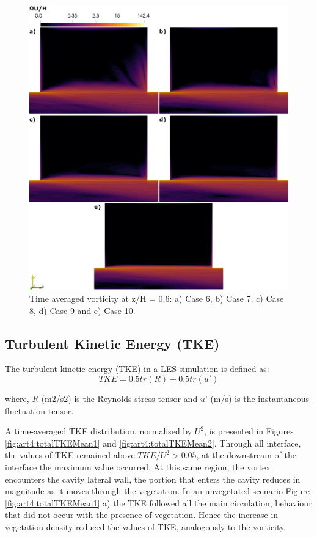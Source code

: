 \begin{figure}[!htb]
\centering
\includegraphics[width=\linewidth]{../images/art4/vorticityMean2.jpeg}
\caption{Time averaged vorticity at z/H = 0.6: a) Case 6, b) Case 7, c) Case 8, d) Case 9 and e) Case 10.}
\label{fig:art4:vorticityMean2}
\end{figure}
\FloatBarrier
\subsection{Turbulent Kinetic Energy (TKE)}
The turbulent kinetic energy (TKE) in a LES simulation is defined as:
\begin{equation}
TKE = 0.5 tr(R) + 0.5 tr(u')
\label{eqn:art4:tke}
\end{equation}

where, $R$ (m2/s2) is the Reynolds stress tensor and $u’$ (m/s) is the instantaneous fluctuation tensor.

A time-averaged TKE distribution, normalised by $U^2$, is presented in Figures \ref{fig:art4:totalTKEMean1} and \ref{fig:art4:totalTKEMean2}. Through all interface, the values of TKE remained above $TKE/U^2 > 0.05$, at the downstream of the interface the maximum value occurred. At this same region, the vortex encounters the cavity lateral wall, the portion that enters the cavity reduces in magnitude as it moves through the vegetation. In an unvegetated scenario Figure \ref{fig:art4:totalTKEMean1} a) the TKE followed all the main circulation, behaviour that did not occur with the presence of vegetation. Hence the increase in vegetation density reduced the values of TKE, analogously to the vorticity.

